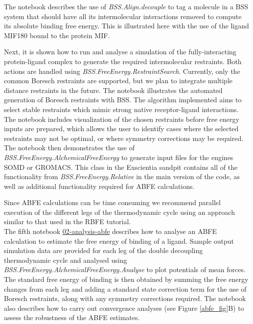 The notebook describes the use of \textit{BSS.Align.decouple} to tag a molecule in a BSS system that should have all its intermolecular interactions removed to compute its absolute binding free energy. This is illustrated here with the use of the ligand MIF180 bound to the protein MIF.\cite{Qian2019, Clark2023} 

Next, it is shown how to run and analyse a simulation of the fully-interacting protein-ligand complex to generate the required intermolecular restraints. Both actions are handled using \textit{BSS.FreeEnergy.RestraintSearch}. Currently, only the common Boresch restraints are supported,\cite{boresch_absolute_2003} but we plan to integrate multiple distance restraints in the future.\cite{Clark2023} 
The notebook illustrates the automated generation of Boresch restraints with BSS. The algorithm implemented aims to select stable restraints which mimic strong native receptor-ligand interactions. The notebook includes visualization of the chosen restraints before free energy inputs are prepared, which allows the user to identify cases where the selected restraints may not be optimal, or where symmetry corrections may be required.\cite{duboue-dijon_building_2021} The notebook then demonstrates the use of \textit{BSS.FreeEnergy.AlchemicalFreeEnergy} to generate input files for the engines SOMD or GROMACS. This class in the Exscientia sandpit contains all of the functionality from \textit{BSS.FreeEnergy.Relative} in the main version of the code, as well as additional functionality required for ABFE calculations.

Since ABFE calculations can be time consuming we recommend parallel execution of the different legs of the thermodynamic cycle using an approach similar to that used in the RBFE tutorial.
\\

The fifth notebook \href{https://github.com/OpenBioSim/biosimspace_tutorials/blob/main/04_fep/03_ABFE/02_analysis_abfe.ipynb}{02-analysis-abfe} describes how to analyse an ABFE calculation to estimate the free energy of binding of a ligand. Sample output simulation data are provided for each leg of the double decoupling thermodynamic cycle and analysed using \textit{BSS.FreeEnergy.AlchemicalFreeEnergy.Analyse} to plot potentials of mean forces. The standard free energy of binding is then obtained by summing the free energy changes from each leg and adding a standard state correction term for the use of Boresch restraints, along with any symmetry corrections required. The notebook also describes how to carry out convergence analyses (see Figure \ref{abfe_fig}B) to assess the robustness of the ABFE estimates.  
